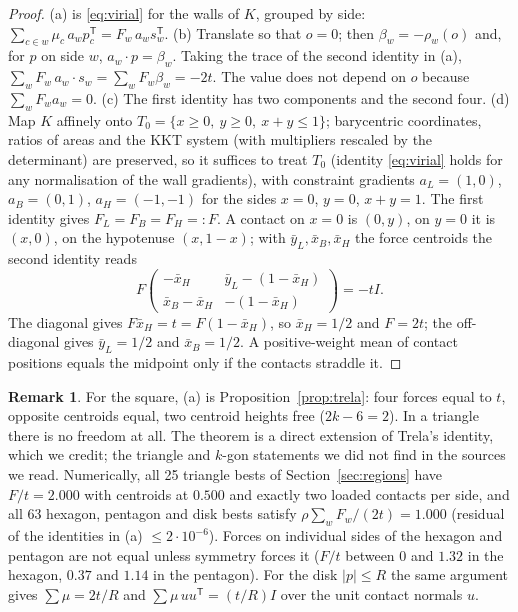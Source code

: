 \documentclass[11pt]{amsart}
\theoremstyle{definition}
\newtheorem{remark}[theorem]{Remark}
\begin{document}
\begin{proof}
(a) is \eqref{eq:virial} for the walls of $K$, grouped by side: $\sum_{c\in w}\mu_c\, a_w p_c^{\mathsf T} = F_w\, a_w s_w^{\mathsf T}$.
(b) Translate so that $o = 0$; then $\beta_w = -\rho_w(o)$ and, for $p$ on side $w$, $a_w \cdot p = \beta_w$. Taking the trace of the second identity in (a), $\sum_w F_w\, a_w\cdot s_w = \sum_w F_w \beta_w = -2t$. The value does not depend on $o$ because $\sum_w F_w a_w = 0$.
(c) The first identity has two components and the second four.
(d) Map $K$ affinely onto $T_0 = \{x \ge 0,\ y \ge 0,\ x+y \le 1\}$; barycentric coordinates, ratios of areas and the KKT system (with multipliers rescaled by the determinant) are preserved, so it suffices to treat $T_0$ (identity \eqref{eq:virial} holds for any normalisation of the wall gradients), with constraint gradients $a_L = (1,0)$, $a_B = (0,1)$, $a_H = (-1,-1)$ for the sides $x = 0$, $y = 0$, $x + y = 1$. The first identity gives $F_L = F_B = F_H =: F$. A contact on $x = 0$ is $(0,y)$, on $y = 0$ it is $(x,0)$, on the hypotenuse $(x, 1-x)$; with $\bar y_L, \bar x_B, \bar x_H$ the force centroids the second identity reads
\[
  F\begin{pmatrix} -\bar x_H & \bar y_L - (1-\bar x_H) \\ \bar x_B - \bar x_H & -(1-\bar x_H)\end{pmatrix} = -tI .
\]
The diagonal gives $F\bar x_H = t = F(1-\bar x_H)$, so $\bar x_H = 1/2$ and $F = 2t$; the off-diagonal gives $\bar y_L = 1/2$ and $\bar x_B = 1/2$. A positive-weight mean of contact positions equals the midpoint only if the contacts straddle it.
\end{proof}

\begin{remark}
For the square, (a) is Proposition~\ref{prop:trela}: four forces equal to $t$, opposite centroids equal, two centroid heights free ($2k-6 = 2$). In a triangle there is no freedom at all. The theorem is a direct extension of Trela's identity, which we credit; the triangle and $k$-gon statements we did not find in the sources we read. %
Numerically, all 25 triangle bests of Section~\ref{sec:regions} have $F/t = 2.000$ with centroids at $0.500$ and exactly two loaded contacts per side, and all 63 hexagon, pentagon and disk bests satisfy $\rho\sum_w F_w/(2t) = 1.000$ (residual of the identities in (a) $\le 2\cdot10^{-6}$). %
Forces on individual sides of the hexagon and pentagon are not equal unless symmetry forces it ($F/t$ between $0$ and $1.32$ in the hexagon, $0.37$ and $1.14$ in the pentagon). %
For the disk $\lvert p\rvert \le R$ the same argument gives $\sum\mu = 2t/R$ and $\sum \mu\, u u^{\mathsf T} = (t/R) I$ over the unit contact normals $u$. %
\end{remark}
\end{document}
